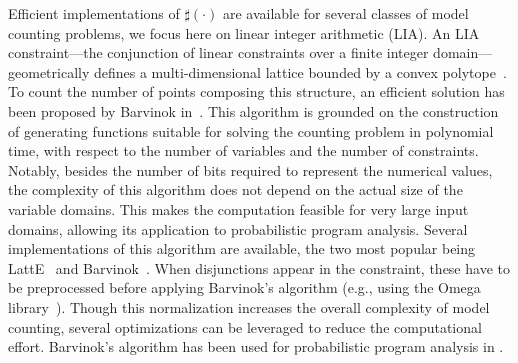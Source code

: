 Efficient implementations of $\sharp(\cdot)$ are available for several classes of model counting problems, we focus here on linear integer arithmetic (LIA).
An LIA constraint---the conjunction of linear constraints over a finite integer domain---geometrically defines a multi-dimensional lattice bounded by a convex polytope~\cite{de2008computationalGeometry}. To count the number of points composing this structure, an efficient solution has been proposed by Barvinok in~\cite{barvinok1994polynomial}. This algorithm is grounded on the construction of generating functions suitable for solving the counting problem in polynomial time, with respect to the number of variables and the number of constraints. Notably, besides the number of bits required to represent the numerical values, the complexity of this algorithm does not depend on the actual size of the variable domains. This makes the computation feasible for very large input domains, allowing its application to probabilistic program analysis. Several implementations of this algorithm are available, the two most popular being LattE~\cite{LattESoftware} and Barvinok~\cite{verdoolaegesoftware}. When disjunctions appear in the constraint, these have to be preprocessed before applying Barvinok's algorithm (e.g., using the Omega library~\cite{Omega1996}). Though this normalization increases the overall complexity of model counting, several optimizations can be leveraged to reduce the computational effort.
Barvinok's algorithm has been used for probabilistic program analysis in \cite{Geldenhuys2012,Filieri2013,Filieri2015}.


